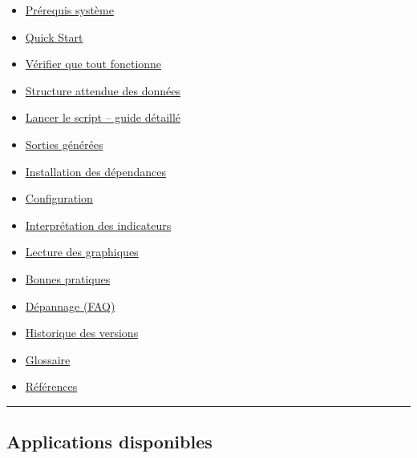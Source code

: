 \begin{itemize}
  \begin{itemize}
  \tightlist
  \item
    \hyperref[-prux5cux25C3ux5cux25A9requis-systux5cux25C3ux5cux25A8me-complets]{Prérequis
    système}
  \item
    \hyperref[-quick-start]{Quick Start}
  \item
    \hyperref[-vux5cux25C3ux5cux25A9rifier-que-tout-fonctionne]{Vérifier
    que tout fonctionne}
  \item
    \hyperref[-structure-attendue-des-donnux5cux25C3ux5cux25A9es]{Structure
    attendue des données}
  \item
    \hyperref[ux5cux25EFux5cux25B8ux5cux258F-lancer-le-script--guide-dux5cux25C3ux5cux25A9taillux5cux25C3ux5cux25A9]{Lancer
    le script -- guide détaillé}
  \item
    \hyperref[-sorties-gux5cux25C3ux5cux25A9nux5cux25C3ux5cux25A9rux5cux25C3ux5cux25A9es]{Sorties
    générées}
  \item
    \hyperref[-installation-des-dux5cux25C3ux5cux25A9pendances]{Installation
    des dépendances}
  \item
    \hyperref[-configuration]{Configuration}
  \item
    \hyperref[-interprux5cux25C3ux5cux25A9tation-des-indicateurs]{Interprétation
    des indicateurs}
  \item
    \hyperref[-lecture-des-graphiques]{Lecture des graphiques}
  \item
    \hyperref[-bonnes-pratiques-dinterprux5cux25C3ux5cux25A9tation]{Bonnes
    pratiques}
  \item
    \hyperref[-dux5cux25C3ux5cux25A9pannage-faq]{Dépannage (FAQ)}
  \item
    \hyperref[-historique-des-versions]{Historique des versions}
  \item
    \hyperref[-glossaire]{Glossaire}
  \item
    \hyperref[-Rux5cux25C3ux5cux25A9fux5cux25C3ux5cux25A9rences]{Références}
  \end{itemize}
\end{itemize}

\begin{center}\rule{0.5\linewidth}{0.5pt}\end{center}

\subsection{Applications disponibles}\label{applications-disponibles}

